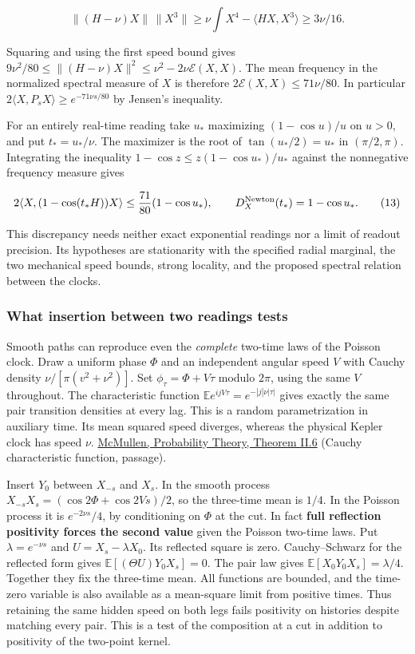 \documentclass[11pt,a4paper]{article}
\begin{document}
\[
 \|(H-\nu)X\|\,\|X^3\|\ge
 \nu\int X^4-\langle HX,X^3\rangle\ge 3\nu/16 .
\]

Squaring and using the first speed bound gives
\(9\nu^2/80\le\|(H-\nu)X\|^2\le\nu^2-2\nu\mathcal E(X,X)\). The mean
frequency in the normalized spectral measure of \(X\) is therefore
\(2\mathcal E(X,X)\le71\nu/80\). In particular
\(2\langle X,P_sX\rangle\ge e^{-71\nu s/80}\) by Jensen's inequality.

For an entirely real-time reading take \(u_*\) maximizing
\((1-\cos u)/u\) on \(u>0\), and put \(t_*=u_*/\nu\). The maximizer is
the root of \(\tan(u_*/2)=u_*\) in \((\pi/2,\pi)\). Integrating the
inequality \(1-\cos z\le z(1-\cos u_*)/u_*\) against the nonnegative
frequency measure gives

\[
 2\langle X,(1-\cos(t_*H))X\rangle
 \le \frac{71}{80}(1-\cos u_*),\qquad
 D_X^{\rm Newton}(t_*)=1-\cos u_* .                               \tag{13}
\]

This discrepancy needs neither exact exponential readings nor a limit of
readout precision. Its hypotheses are stationarity with the specified
radial marginal, the two mechanical speed bounds, strong locality, and
the proposed spectral relation between the clocks.

\subsubsection{What insertion between two readings
tests}\label{what-insertion-between-two-readings-tests}

Smooth paths can reproduce even the \emph{complete} two-time laws of the
Poisson clock. Draw a uniform phase \(\Phi\) and an independent angular
speed \(V\) with Cauchy density \(\nu/[\pi(v^2+\nu^2)]\). Set
\(\phi_\tau=\Phi+V\tau\) modulo \(2\pi\), using the same \(V\)
throughout. The characteristic function
\(\mathbb E e^{ijV\tau}=e^{-|j|\nu|\tau|}\) gives exactly the same pair
transition densities at every lag. This is a random parametrization in
auxiliary time. Its mean squared speed diverges, whereas the physical
Kepler clock has speed \(\nu\).
\href{https://people.math.harvard.edu/~ctm/papers/home/text/class/harvard/154/course/course.pdf}{McMullen,
Probability Theory, Theorem II.6} (Cauchy characteristic function,
passage).

Insert \(Y_0\) between \(X_{-s}\) and \(X_s\). In the smooth process
\(X_{-s}X_s=(\cos 2\Phi+\cos 2Vs)/2\), so the three-time mean is
\(1/4\). In the Poisson process it is \(e^{-2\nu s}/4\), by conditioning
on \(\Phi\) at the cut. In fact \textbf{full reflection positivity
forces the second value} given the Poisson two-time laws. Put
\(\lambda=e^{-\nu s}\) and \(U=X_s-\lambda X_0\). Its reflected square
is zero. Cauchy--Schwarz for the reflected form gives
\(\mathbb E[(\Theta U)Y_0X_s]=0\). The pair law gives
\(\mathbb E[X_0Y_0X_s]=\lambda/4\). Together they fix the three-time
mean. All functions are bounded, and the time-zero variable is also
available as a mean-square limit from positive times. Thus retaining the
same hidden speed on both legs fails positivity on histories despite
matching every pair. This is a test of the composition at a cut in
addition to positivity of the two-point kernel.
\end{document}

